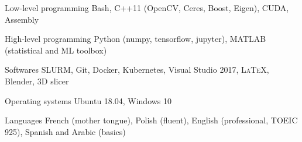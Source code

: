 


\begin{cvskills}


\cvskill
{Low-level programming} %
{Bash, C++11 (OpenCV, Ceres, Boost, Eigen), CUDA, Assembly} %


\cvskill
{High-level programming} %
{Python (numpy, tensorflow, jupyter), MATLAB (statistical and ML toolbox)} %


\cvskill
{Softwares} %
{SLURM, Git, Docker, Kubernetes, Visual Studio 2017, \textsc{\LaTeX}, Blender, 3D slicer} %


\cvskill
{Operating systems} %
{Ubuntu 18.04, Windows 10} %


\cvskill
{Languages} %
{French (mother tongue), Polish (fluent), English (professional, TOEIC 925), Spanish and Arabic (basics)} %


\end{cvskills}
